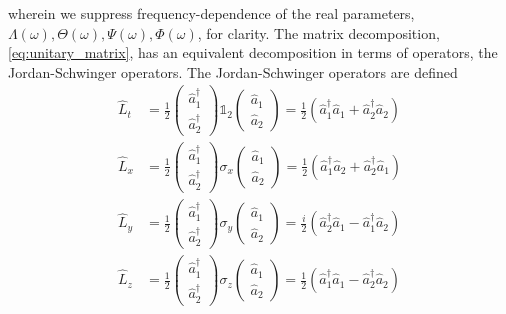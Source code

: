 wherein we suppress frequency-dependence of the real parameters, $\Lambda(\omega),\Theta(\omega),\Psi(\omega),\Phi(\omega)$, for clarity.
The matrix decomposition, \cref{eq:unitary_matrix}, has an equivalent decomposition in terms of operators, the Jordan-Schwinger operators.
The Jordan-Schwinger operators are defined~\cite[p.~97]{Leonhardt2010}
\begin{align}
	\hat{L}_t
	&=
	\frac{1}{2}
	\begin{pmatrix}
		\hat{a}_1^\dagger \\
		\hat{a}_2^\dagger
	\end{pmatrix}
	\mathbb{1}_2
	\begin{pmatrix}
		\hat{a}_1 \\
		\hat{a}_2
	\end{pmatrix}
	=
	\frac{1}{2}
	\left(
		\hat{a}_1^\dagger
		\hat{a}_1
		+
		\hat{a}_2^\dagger
		\hat{a}_2
	\right)
	\\
	\hat{L}_x
	&=
	\frac{1}{2}
	\begin{pmatrix}
		\hat{a}_1^\dagger \\
		\hat{a}_2^\dagger
	\end{pmatrix}
	\sigma_x
	\begin{pmatrix}
		\hat{a}_1 \\
		\hat{a}_2
	\end{pmatrix}
	=
	\frac{1}{2}
	\left(
		\hat{a}_1^\dagger
		\hat{a}_2
		+
		\hat{a}_2^\dagger
		\hat{a}_1
	\right)
	\\
	\hat{L}_y
	&=
	\frac{1}{2}
	\begin{pmatrix}
		\hat{a}_1^\dagger \\
		\hat{a}_2^\dagger
	\end{pmatrix}
	\sigma_y
	\begin{pmatrix}
		\hat{a}_1 \\
		\hat{a}_2
	\end{pmatrix}
	=
	\frac{i}{2}
	\left(
		\hat{a}_2^\dagger
		\hat{a}_1
		-
		\hat{a}_1^\dagger
		\hat{a}_2
	\right)
	\\
	\hat{L}_z
	&=
	\frac{1}{2}
	\begin{pmatrix}
		\hat{a}_1^\dagger \\
		\hat{a}_2^\dagger
	\end{pmatrix}
	\sigma_z
	\begin{pmatrix}
		\hat{a}_1 \\
		\hat{a}_2
	\end{pmatrix}
	=
	\frac{1}{2}
	\left(
		\hat{a}_1^\dagger
		\hat{a}_1
		-
		\hat{a}_2^\dagger
		\hat{a}_2
	\right)
\end{align}
